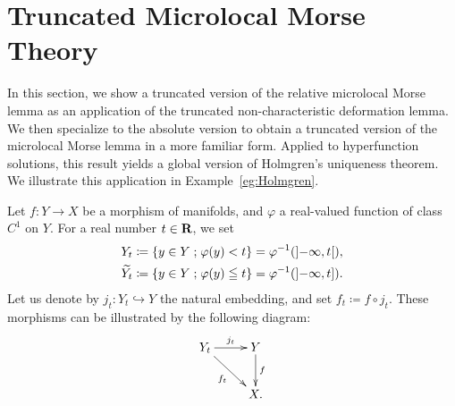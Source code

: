 \section{Truncated Microlocal Morse Theory}\label{sec:t-morse}

In this section, we show a truncated version of 
the relative microlocal Morse lemma as an application of the 
truncated non-characteristic deformation lemma. 
We then specialize to the absolute version to 
obtain a truncated version of the microlocal Morse lemma 
in a more familiar form. 
Applied to hyperfunction solutions, this result yields 
a global version of Holmgren's uniqueness theorem. 
We illustrate this application in Example~\ref{eg:Holmgren}.

Let \(f\colon Y\to X\) be a morphism of manifolds, and 
\(\varphi\) a real-valued function of class \(C^1\) on \(Y\). 
For a real number \(t\in \mathbf{R}\), we set 
\begin{align*}
  Y_t
  &\coloneqq \left\{y\in Y\mathrel{;} \varphi(y)< t\right\} 
  = \varphi^{-1}(\left]-\infty,t\right[),\\
  \widetilde{Y_t}
  &\coloneqq \left\{y\in Y\mathrel{;} \varphi(y)\leqq t\right\} 
  = \varphi^{-1}(\left]-\infty,t\right]).
\end{align*}
Let us denote by \(j_{t}\colon Y_{t}\hookrightarrow Y\) the 
natural embedding, 
and set \(f_{t}\coloneqq f\circ j_{t}\).
These morphisms can be illustrated by the following diagram:
\[\xymatrix{
  Y_t\ar[r]^-{j_t}
  \ar[rd]_-{f_t}
  &
  Y
  \ar[d]^-{f}\\
  &X.
}%
\]

